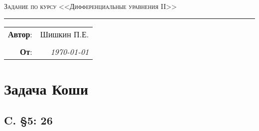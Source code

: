 \documentclass{article}
\begin{document}
\setlength{\abovedisplayskip}{3pt}
\setlength{\abovedisplayshortskip}{3pt}
\setlength{\belowdisplayskip}{3pt}
\setlength{\belowdisplayshortskip}{3pt}


\begin{center}
    \LARGE \textsc{Задание по курсу <<Дифференциальные уравнения II>>}
\end{center}

\hrule

\phantom{42}

\begin{flushright}
    \begin{tabular}{rr}
        \textbf{Автор}: 
        & Шишкин П.Е. \\
        &\\
        \textbf{От}: &
        \textit{\today}\\
    \end{tabular}
\end{flushright}

\thispagestyle{empty}
\tableofcontents
\newpage



\section{Задача Коши}
\subsection{C. \S5: 26}
\end{document}
